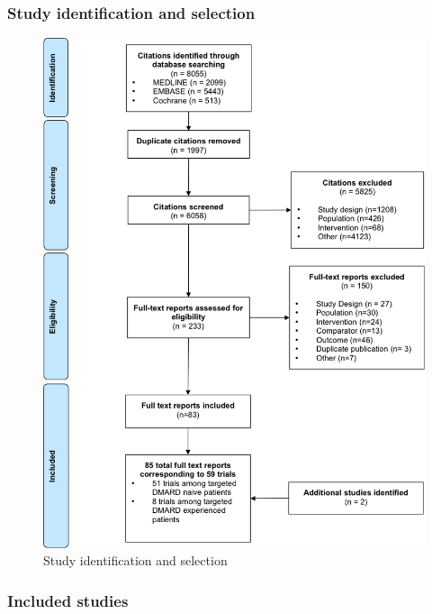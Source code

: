 \documentclass[11pt,final,fleqn]{article}\usepackage[]{graphicx}\usepackage[]{color}
\theoremstyle{plain}
\begin{document}
\begin{appendices}
\subsubsection{Study identification and selection}
\begin{figure}[H]
\centering
\includegraphics{study-selection.png}
\vspace*{10mm}
\caption{Study identification and selection}\label{fig:study-identification}
\end{figure}

\subsubsection{Included studies}



\end{appendices}
\end{document}
